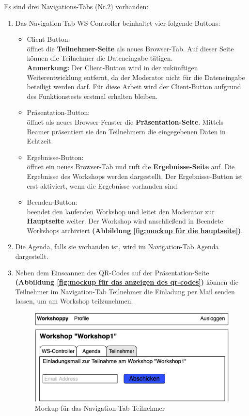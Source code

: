 Es sind drei Navigations-Tabs (Nr.2) vorhanden:
\begin{enumerate}
\item Das Navigation-Tab \glqq WS-Controller\grqq{} beinhaltet vier folgende Buttons:
\begin{itemize}
\item Client-Button:\\
öffnet die \textbf{Teilnehmer-Seite} als neues Browser-Tab. Auf dieser Seite können die Teilnehmer die Dateneingabe tätigen.\\
\textbf{Anmerkung:} Der Client-Button wird in der zukünftigen Weiterentwicklung entfernt, da der Moderator nicht für die Dateneingabe beteiligt werden darf. Für diese Arbeit wird der Client-Button aufgrund des Funktionstests erstmal erhalten bleiben.
\item Präsentation-Button:\\
öffnet als neues Browser-Fenster die \textbf{Präsentation-Seite}. Mittels Beamer präsentiert sie den Teilnehmern die eingegebenen Daten in Echtzeit.
\item Ergebnisse-Button:\\
öffnet ein neues Browser-Tab und ruft die \textbf{Ergebnisse-Seite} auf. Die Ergebnisse des Workshops werden dargestellt. Der Ergebnisse-Button ist erst aktiviert, wenn die Ergebnisse vorhanden sind.
\item Beenden-Button:\\
beendet den laufenden Workshop und leitet den Moderator zur \textbf{Hauptseite} weiter. Der Workshop wird anschließend in \glqq Beendete Workshops\grqq{} archiviert \textbf{(Abbildung \ref{fig:mockup für die hauptseite})}.
\end{itemize}
\item Die Agenda, falls sie vorhanden ist, wird im Navigation-Tab \glqq Agenda\grqq{} dargestellt.
\item Neben dem Einscannen des QR-Codes auf der Präsentation-Seite \textbf{(Abbildung \ref{fig:mockup für das anzeigen des qr-codes})} können die Teilnehmer im Navigation-Tab \glqq Teilnehmer\grqq{} die Einladung per Mail senden lassen, um am Workshop teilzunehmen.\bigskip

\begin{figure}[H]
  \begin{center}
    \includegraphics[scale=0.45]{img/einladungsmail}
	\caption{Mockup für das Navigation-Tab \glqq Teilnehmer\grqq{}}  
	\label{fig:mockup für einladungsmail}
  \end{center}   
\end{figure}
\end{enumerate}

